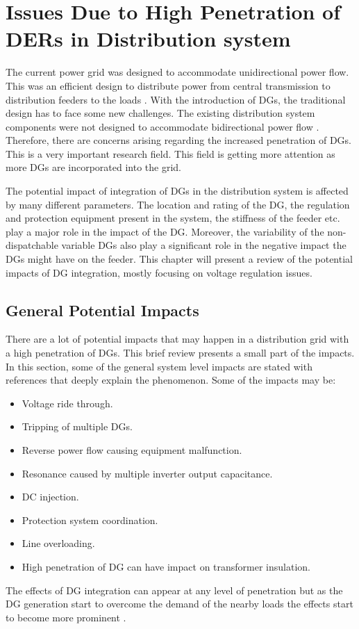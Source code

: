 \section{Issues Due to High Penetration of DERs in Distribution system}
The current power grid was designed to accommodate unidirectional power flow. This was an efficient design to distribute power from central transmission to distribution feeders to the loads \cite{HPPV}.  With the introduction of DGs, the traditional design has to face some new challenges. The existing distribution system components were not designed to accommodate bidirectional power flow \cite{HPPV}. Therefore, there are concerns arising regarding the increased penetration of DGs. This is a very important research field. This field is getting more attention as more DGs are incorporated into the grid. 

The potential impact of integration of DGs in the distribution system is affected by many different parameters. The location and rating of the DG, the regulation and protection equipment present in the system, the stiffness of the feeder etc. play a major role in the impact of the DG. Moreover, the variability of the non-dispatchable variable DGs also play a significant role in the negative impact the DGs might have on the feeder. This chapter will present a review of the potential impacts of DG integration, mostly focusing on voltage regulation issues.

\subsection{General Potential Impacts}
There are a lot of potential impacts that may happen in a distribution grid with a high penetration of DGs. This brief review presents a small part of the impacts. In this section, some of the general system level impacts are stated with references that deeply explain the phenomenon. Some of the impacts may be:
\begin{itemize}
    \item Voltage ride through. \cite{GPI1}
    \item Tripping of multiple DGs.\cite{GP2}
    \item Reverse power flow causing equipment malfunction. \cite{GP3}
    \item Resonance caused by multiple inverter output capacitance. \cite{GP4}
    \item DC injection. \cite{GP5}
    \item Protection system coordination. \cite{GP3}
    \item Line overloading. \cite{GP6}
    \item High penetration of DG can have impact on transformer insulation. \cite{GP4}
\end{itemize}
The effects of DG integration can appear at any level of penetration but as the DG generation start to overcome the demand of the nearby loads the effects start to become more prominent \cite{Th_ali}.


